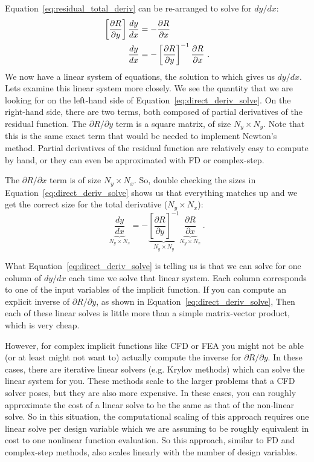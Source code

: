 \documentclass[conf]{new-aiaa}
\begin{document}
    Equation~\eqref{eq:residual_total_deriv} can be re-arranged to solve for $dy/dx$: 
    \begin{align}
        \left[\frac{\partial R}{\partial y}\right] \frac{dy}{dx}& = - \frac{\partial R}{\partial x} \notag \\
        \frac{dy}{dx} &= - \left[\frac{\partial R}{\partial y}\right]^{-1} \frac{\partial R}{\partial x} \ . \label{eq:direct_deriv_solve}
    \end{align}
    We now have a linear system of equations, the solution to which gives us $dy/dx$. 
    Lets examine this linear system more closely. 
    We see the quantity that we are looking for on the left-hand side of Equation~\eqref{eq:direct_deriv_solve}.
    On the right-hand side, there are two terms, both composed of partial derivatives of the residual function. 
    The $\partial R/\partial y$ term is a square matrix, of size $N_y \times N_y$. 
    Note that this is the same exact term that would be needed to implement Newton's method. 
    Partial derivatives of the residual function are relatively easy to compute by hand, or they can even be approximated with FD or complex-step. 

    The $\partial R/\partial x$ term is of size $N_y \times N_x$. 
    So, double checking the sizes in Equation~\eqref{eq:direct_deriv_solve} shows us that everything matches up and we get the correct size for the total derivative ($N_y \times N_x$): 
    \begin{equation}
        \underbrace{\frac{dy}{dx}}_{N_y \times N_x} = 
        - \underbrace{\left[\frac{\partial R}{\partial y}\right]^{-1}}_{N_y \times N_y} 
        \underbrace{\frac{\partial R}{\partial x}}_{N_y \times N_x} \ . \label{eq:direct_deriv_solve}
    \end{equation}

    What Equation~\eqref{eq:direct_deriv_solve} is telling us is that we can solve for one column of $dy/dx$ each time we solve that linear system. 
    Each column corresponds to one of the input variables of the implicit function. 
    If you can compute an explicit inverse of $\partial R/\partial y$, as shown in Equation~\eqref{eq:direct_deriv_solve},
    Then each of these linear solves is little more than a simple matrix-vector product, which is very cheap. 
    
    However, for complex implicit functions like CFD or FEA you might not be able (or at least might not want to) actually compute the inverse for $\partial R/\partial y$. 
    In these cases, there are iterative linear solvers (e.g. Krylov methods) which can solve the linear system for you. 
    These methods scale to the larger problems that a CFD solver poses, but they are also more expensive. 
    In these cases, you can roughly approximate the cost of a linear solve to be the same as that of the non-linear solve. 
    So in this situation, the computational scaling of this approach requires one linear solve per design variable which we are assuming to be roughly equivalent in cost to one nonlinear function evaluation. 
    So this approach, similar to FD and complex-step methods, also scales linearly with the number of design variables. 
\end{document}
